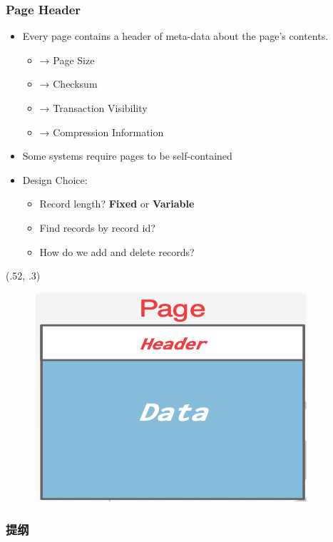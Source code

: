 \begin{frame}[fragile]
	\frametitle{Page Header}
	\begin{itemize}
		\item Every page contains a header of meta-data about the page's contents.
		\begin{itemize}
			\item → Page Size
			\item → Checksum
			\item → Transaction Visibility
			\item → Compression Information
		\end{itemize}
		\item Some systems require pages to be self-contained
		\item Design Choice:
		\begin{itemize}
			\item Record length? \textbf{Fixed} or \textbf{Variable}
			\item Find records by record id?
			\item How do we add and delete records?
		\end{itemize}
	\end{itemize}
	\begin{textblock*}{.45\paperwidth}(.52\paperwidth, .3\paperheight) %
		\begin{figure}
			\includegraphics[width=.4\linewidth]{figs/dbfile-pageheader.png}
		\end{figure}
	\end{textblock*}
\end{frame}

\begin{frame}
\frametitle{提纲} %
\tableofcontents %

\end{frame}

